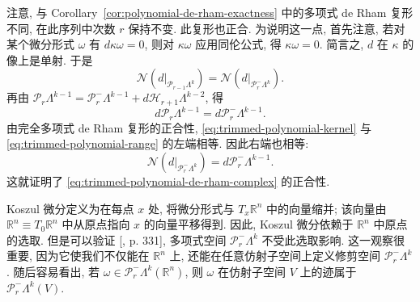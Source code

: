 {注意, 与 Corollary~\ref{cor:polynomial-de-rham-exactness} 中的多项式 de Rham 复形不同, 在此序列中次数 $r$ 保持不变. 此复形也正合. 为说明这一点, 首先注意, 若对某个微分形式 $\omega$ 有 $d\kappa\omega=0$, 则对 $\kappa\omega$ 应用同伦公式, 得 $\kappa\omega=0$. 简言之, $d$ 在 $\kappa$ 的像上是单射. 于是}
\begin{equation}\label{eq:trimmed-polynomial-kernel}
\mathcal N(d|_{\mathcal P_{r-1}\Lambda^k})=\mathcal N(d|_{\mathcal P_r^-\Lambda^k}).
\end{equation}
{再由 $\mathcal P_r\Lambda^{k-1}=\mathcal P_r^-\Lambda^{k-1}+d\mathcal H_{r+1}\Lambda^{k-2}$, 得}
\begin{equation}\label{eq:trimmed-polynomial-range}
d\mathcal P_r\Lambda^{k-1}=d\mathcal P_r^-\Lambda^{k-1}.
\end{equation}
{由完全多项式 de Rham 复形的正合性, \eqref{eq:trimmed-polynomial-kernel} 与 \eqref{eq:trimmed-polynomial-range} 的左端相等. 因此右端也相等:}
\[
\mathcal N(d|_{\mathcal P_r^-\Lambda^k})=d\mathcal P_r^-\Lambda^{k-1}.
\]
{这就证明了 \eqref{eq:trimmed-polynomial-de-rham-complex} 的正合性.}


\begin{Remark}\label{rem:trimmed-origin-independence}
{Koszul 微分定义为在每点 $x$ 处, 将微分形式与 $T_x\mathbb R^n$ 中的向量缩并; 该向量由 $\mathbb R^n\equiv T_0\mathbb R^n$ 中从原点指向 $x$ 的向量平移得到. 因此, Koszul 微分依赖于 $\mathbb R^n$ 中原点的选取. 但是可以验证 [, p. 331], 多项式空间 $\mathcal P_r^-\Lambda^k$ 不受此选取影响. 这一观察很重要, 因为它使我们不仅能在 $\mathbb R^n$ 上, 还能在任意仿射子空间上定义修剪空间 $\mathcal P_r^-\Lambda^k$. 随后容易看出, 若 $\omega\in\mathcal P_r^-\Lambda^k(\mathbb R^n)$, 则 $\omega$ 在仿射子空间 $V$ 上的迹属于 $\mathcal P_r^-\Lambda^k(V)$.}
\end{Remark}
